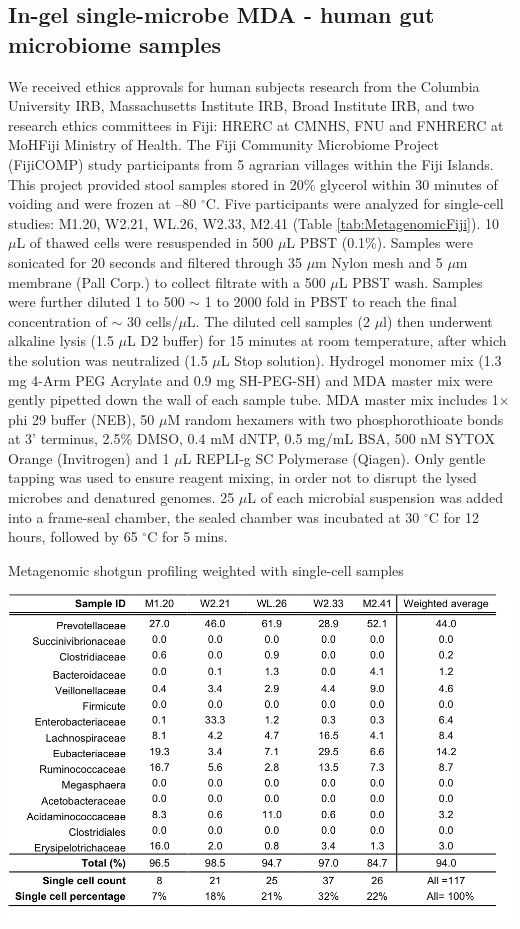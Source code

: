 \subsection{In-gel single-microbe MDA - human gut microbiome samples}
We received ethics approvals for human subjects research from the Columbia University IRB, Massachusetts Institute IRB, Broad Institute IRB, and two research ethics committees in Fiji: HRERC at CMNHS, FNU and FNHRERC at MoHFiji Ministry of Health. The Fiji Community Microbiome Project (FijiCOMP) study participants from 5 agrarian villages within the Fiji Islands. This project provided stool samples stored in 20\% glycerol within 30 minutes of voiding and were frozen at --80 $^{\circ}$C. Five participants were analyzed for single-cell studies: M1.20, W2.21, WL.26, W2.33, M2.41 (Table \ref{tab:MetagenomicFiji}). 10 $\mu$L of thawed cells were resuspended in 500 $\mu$L PBST (0.1\%). Samples were sonicated for 20 seconds and filtered through 35 $\mu$m Nylon mesh and 5 $\mu$m membrane (Pall Corp.) to collect filtrate with a 500 $\mu$L PBST wash. Samples were further diluted 1 to 500 $\sim$ 1 to 2000 fold in PBST to reach the final concentration of $\sim$ 30 cells\slash $\mu$L. The diluted cell samples (2 $\mu$l) then underwent alkaline lysis (1.5 $\mu$L D2 buffer) for 15 minutes at room temperature, after which the solution was neutralized (1.5 $\mu$L Stop solution). Hydrogel monomer mix (1.3 mg 4-Arm PEG Acrylate and 0.9 mg SH-PEG-SH) and MDA master mix were gently pipetted down the wall of each sample tube. MDA master mix includes 1$\times$ phi 29 buffer (NEB), 50 $\mu$M random hexamers with two phosphorothioate bonds at 3' terminus, 2.5\% DMSO, 0.4 mM dNTP, 0.5 mg\slash mL BSA, 500 nM SYTOX Orange (Invitrogen) and 1 $\mu$L REPLI-g SC Polymerase (Qiagen). Only gentle tapping was used to ensure reagent mixing, in order not to disrupt the lysed microbes and denatured genomes. 25 $\mu$L of each microbial suspension was added into a frame-seal chamber, the sealed chamber was incubated at 30 $^{\circ}$C for 12 hours, followed by 65 $^{\circ}$C for 5 mins.

\begin{table}
\caption{Metagenomic shotgun profiling weighted with single-cell samples}
\label{tab:MetagenomicFiji}
\includegraphics[width=\linewidth]{./figures/MetagenomicShotgunProfilingFiji}
\end{table}

